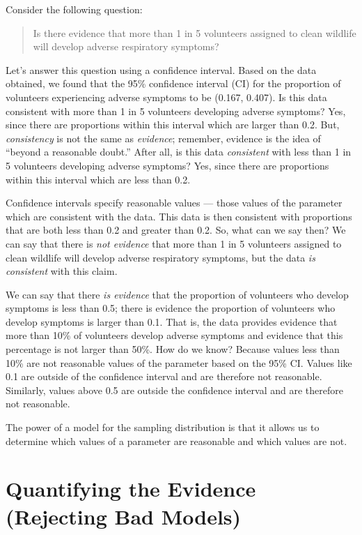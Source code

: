 \documentclass[
]{book}
\theoremstyle{plain}
\theoremstyle{mydefn}
\theoremstyle{myexmpl}
\theoremstyle{remark}
\begin{document}
Consider the following question:

\begin{quote}
Is there evidence that more than 1 in 5 volunteers assigned to clean wildlife will develop adverse respiratory symptoms?
\end{quote}

Let's answer this question using a confidence interval. Based on the data obtained, we found that the 95\% confidence interval (CI) for the proportion of volunteers experiencing adverse symptoms to be (0.167, 0.407). Is this data consistent with more than 1 in 5 volunteers developing adverse symptoms? Yes, since there are proportions within this interval which are larger than 0.2. But, \emph{consistency} is not the same as \emph{evidence}; remember, evidence is the idea of ``beyond a reasonable doubt.'' After all, is this data \emph{consistent} with less than 1 in 5 volunteers developing adverse symptoms? Yes, since there are proportions within this interval which are less than 0.2.

Confidence intervals specify reasonable values --- those values of the parameter which are consistent with the data. This data is then consistent with proportions that are both less than 0.2 and greater than 0.2. So, what can we say then? We can say that there is \emph{not evidence} that more than 1 in 5 volunteers assigned to clean wildlife will develop adverse respiratory symptoms, but the data \emph{is consistent} with this claim.

We can say that there \emph{is evidence} that the proportion of volunteers who develop symptoms is less than 0.5; there is evidence the proportion of volunteers who develop symptoms is larger than 0.1. That is, the data provides evidence that more than 10\% of volunteers develop adverse symptoms and evidence that this percentage is not larger than 50\%. How do we know? Because values less than 10\% are not reasonable values of the parameter based on the 95\% CI. Values like 0.1 are outside of the confidence interval and are therefore not reasonable. Similarly, values above 0.5 are outside the confidence interval and are therefore not reasonable.

The power of a model for the sampling distribution is that it allows us to determine which values of a parameter are reasonable and which values are not.

\hypertarget{NullDistns}{%
\chapter{Quantifying the Evidence (Rejecting Bad Models)}\label{NullDistns}}
\end{document}
